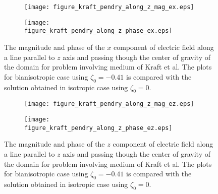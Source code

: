 \begin{figure}[H]
\centering
\begin{subfigure}[b]{0.49\textwidth}
\texttt{[image: figure\_kraft\_pendry\_along\_z\_mag\_ex.eps]}
\end{subfigure}
%
\begin{subfigure}[b]{0.49\textwidth}
\centering
\texttt{[image: figure\_kraft\_pendry\_along\_z\_phase\_ex.eps]}
\end{subfigure}
\caption{The magnitude and phase of the $x$ component of electric field along a line parallel to $z$ axis 
and passing though the center of gravity of the domain for problem involving medium of Kraft et al. 
The plots for bianisotropic case using $\zeta_0 = -0.41$ is compared with 
the solution obtained in isotropic case using $\zeta_0 = 0$.}
\label{fi:kraft_pendry_ex_vs_z}
\end{figure}

\begin{figure}[H]
\centering
\begin{subfigure}[b]{0.49\textwidth}
\texttt{[image: figure\_kraft\_pendry\_along\_z\_mag\_ez.eps]}
\end{subfigure}
%
\begin{subfigure}[b]{0.49\textwidth}
\centering
\texttt{[image: figure\_kraft\_pendry\_along\_z\_phase\_ez.eps]}
\end{subfigure}
\caption{The magnitude and phase of the $z$ component of electric field along a line parallel to $z$ axis 
and passing though the center of gravity of the domain  for problem involving medium of Kraft et al. 
The plots for bianisotropic case using $\zeta_0 = -0.41$ is compared with 
the solution obtained in isotropic case using $\zeta_0 = 0$.}
\label{fi:kraft_pendry_ez_vs_z}
\end{figure}
